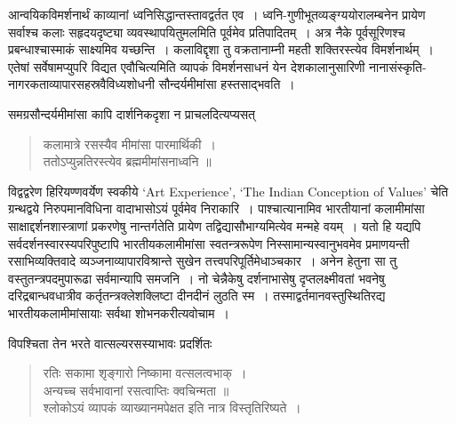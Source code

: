 {\dev आन्वयिकविमर्शनार्थं काव्यानां ध्वनिसिद्धान्तस्तावद्वर्तत एव~। ध्वनि-गुणीभूतव्यङ्ग्ययो\-रालम्ब\-नेन प्रायेण सर्वाश्च कलाः सहृदयदृष्ट्या व्यवस्थापयितुमलमिति पूर्वमेव प्रतिपादितम्~। अत्र नैके पूर्वसूरिणश्च प्रबन्धाश्चास्माकं साक्ष्यमिव यच्छन्ति~। कलाविद्दृशा तु वक्रतानाम्नी महती शक्तिरस्त्येव विमर्शनार्थम्~। एतेषां सर्वेषामप्युपरि विद्यत एवौचित्यमिति व्यापकं विमर्शन\-साधनं येन देशकालानुसारिणी नानासंस्कृति-नागरकताव्यापारसहस्रवैविध्यशोधनी सौन्दर्य\-मीमांसा हस्तसाद्भवति~।}

{\dev समग्रसौन्दर्यमीमांसा कापि दार्शनिकदृशा न प्राचलदित्यप्यसत्}
\begin{quote}
{\dev कलामात्रे रसस्यैव मीमांसा पारमार्थिकी~।}\\
{\dev ततोऽप्युन्नतिरस्त्येव ब्रह्ममीमांसनाध्वनि ॥}
\end{quote}

{\dev विद्वद्वरेण हिरियण्णवर्येण स्वकीये} `Art Experience', `The Indian Conception of Values' {\dev चेति ग्रन्थद्वये निरुपमानविधिना वादाभासोऽयं पूर्वमेव निराकारि~। पाश्चात्यानामिव भारतीयानां कलामीमांसा साक्षाद्दर्शनशास्त्राणां प्रकरणेषु नान्तर्गतेति प्रायेण तद्विद्यासौभाग्य\-मित्येव मन्महे वयम्~। यतो हि यद्यपि सर्वदर्शनस्वारस्यपरिपुष्टापि भारतीयकलामीमांसा स्वतन्त्ररूपेण निस्सामान्यस्वानुभवमेव  प्रमाणयन्ती रसाभिव्यक्तिवादे व्यञ्जनाव्यापारविश्रान्ते सुखेन तत्त्वपरिपूर्तिमेधाञ्चकार~। अनेन हेतुना सा तु वस्तुतन्त्रपदमुपारूढा सर्वमान्यापि सम\-जनि~। नो चेन्नैकेषु दर्शनाभासेषु दृप्तलक्ष्मीवतां भवनेषु दरिद्रबान्धवधात्रीव कर्तृतन्त्रक्लेशक्लिष्टा दीनदीनं लुठति स्म~। तस्माद्वर्तमानवस्तुस्थितिरद्य भारतीयकलामीमांसायाः सर्वथा शोभन\-करीत्यवोचाम~।}

{\dev विपश्चिता तेन भरते वात्सल्यरसस्याभावः प्रदर्शितः}
\begin{quote}
{\dev रतिः सकामा शृङ्गारो निष्कामा वत्सलत्वभाक्~।}\\
{\dev अन्यच्च सर्वभावानां रसत्वाप्तिः क्वचिन्मता ॥}\\[5pt]
{\dev श्लोकोऽयं व्यापकं व्याख्यानमपेक्षत इति नात्र विस्तृतिरिष्यते~।}
\end{quote}

